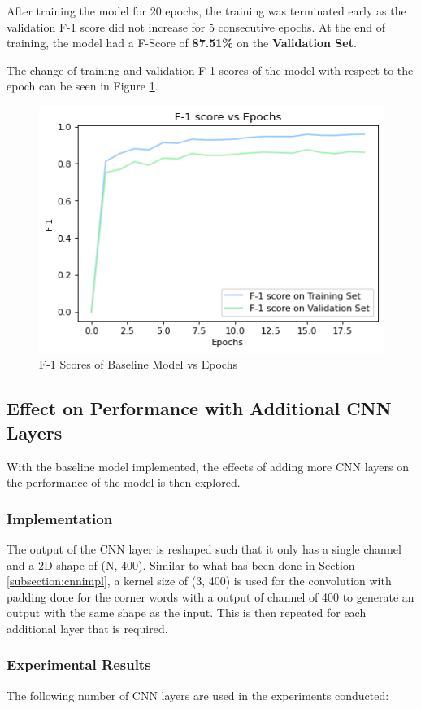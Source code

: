 \documentclass[sigconf,nonacm=true]{acmart}
\begin{document}
After training the model for 20 epochs, the training was terminated early as the validation F-1 score did not increase for 5 consecutive epochs. At the end of training, the model had a F-Score of \textbf{87.51\%} on the \textbf{Validation Set}.

The change of training and validation F-1 scores of the model with respect to the epoch can be seen in Figure \ref{fig:singlelayerf1}.


\begin{figure}[H]
	\centering
	\includegraphics[scale=0.55]{figures/1layerf1.png}
	\caption{F-1 Scores of Baseline Model vs Epochs}
	\label{fig:singlelayerf1}
\end{figure}

\subsection{Effect on Performance with Additional CNN Layers}
With the baseline model implemented, the effects of adding more CNN layers on the performance of the model is then explored. 

\subsubsection{Implementation}
The output of the CNN layer is reshaped such that it only has a single channel and a 2D shape of (N, 400). Similar to what has been done in Section \ref{subsection:cnnimpl}, a kernel size of (3, 400) is used for the convolution with padding done for the corner words with a output of channel of 400 to generate an output with the same shape as the input. This is then repeated for each additional layer that is required.

\subsubsection{Experimental Results}
The following number of CNN layers are used in the experiments conducted:
\end{document}
